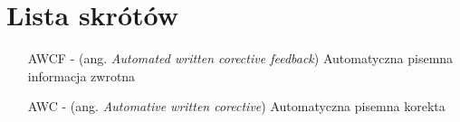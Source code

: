 \chapter*{Lista skrótów}

\begin{itemize}[noitemsep,topsep=0pt,parsep=0pt,partopsep=0pt,labelwidth=1cm,align=left,itemindent=0pt]
\item[AWCF] - (ang. \textit{Automated written corective feedback}) Automatyczna pisemna informacja zwrotna
\item[AWC] - (ang. \textit{Automative written corective}) Automatyczna pisemna korekta
\end{itemize}